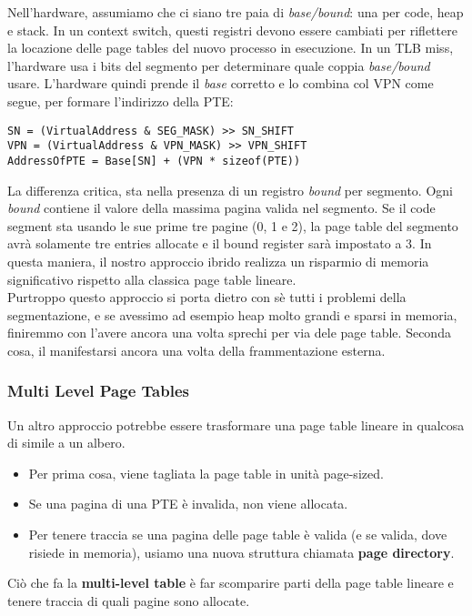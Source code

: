 \documentclass[12pt, twoside, letterpaper]{article}
\begin{document}
				Nell'hardware, assumiamo che ci siano tre paia di \textit{base/bound}: una per code, heap e stack. In un context switch, questi registri devono essere cambiati per riflettere la locazione delle page tables del nuovo processo in esecuzione. In un TLB miss, l'hardware usa i bits del segmento per determinare quale coppia \textit{base/bound} usare. L'hardware quindi prende il \textit{base} corretto e lo combina col VPN come segue, per formare l'indirizzo della PTE: 
				\begin{lstlisting}[style=CStyle]
SN = (VirtualAddress & SEG_MASK) >> SN_SHIFT
VPN = (VirtualAddress & VPN_MASK) >> VPN_SHIFT
AddressOfPTE = Base[SN] + (VPN * sizeof(PTE)) \end{lstlisting}
				La differenza critica, sta nella presenza di un registro \textit{bound} per segmento. Ogni \textit{bound} contiene il valore della massima pagina valida nel segmento. Se il code segment sta usando le sue prime tre pagine (0, 1 e 2), la page table del segmento avrà solamente tre entries allocate e il bound register sarà impostato a 3. In questa maniera, il nostro approccio ibrido realizza un risparmio di memoria significativo rispetto alla classica page table lineare.\\ 
				
				Purtroppo questo approccio si porta dietro con sè tutti i problemi della segmentazione, e se avessimo ad esempio heap molto grandi e sparsi in memoria, finiremmo con l'avere ancora una volta sprechi per via dele page table. Seconda cosa, il manifestarsi ancora una volta della frammentazione esterna. 
				
			\subsubsection{Multi Level Page Tables}
				Un altro approccio potrebbe essere trasformare una page table lineare in qualcosa di simile a un albero.
				\begin{itemize}
					\item Per prima cosa, viene tagliata la page table in unità page-sized.
					\item Se una pagina di una PTE è invalida, non viene allocata.
					\item Per tenere traccia se una pagina delle page table è valida (e se valida, dove risiede in memoria), usiamo una nuova struttura chiamata \textbf{page directory}.
				\end{itemize}
				Ciò che fa la \textbf{multi-level table} è far scomparire parti della page table lineare e tenere traccia di quali pagine sono allocate.\\
				
\end{document}

